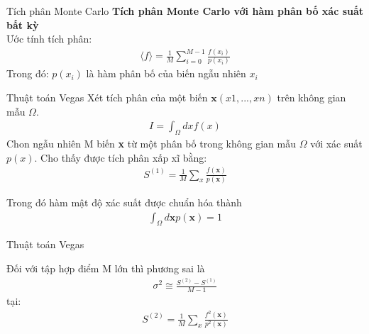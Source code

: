 \documentclass{beamer}
\begin{document}
\begin{frame}{Tích phân Monte Carlo}\vspace{4pt}
  \textbf{Tích phân Monte Carlo với hàm phân bố xác suất bất kỳ}\\
  \vspace{4em}
    Ước tính tích phân: 
  \begin{align}
    \langle{f}\rangle=\frac{1}{M}\sum_{i=0}^{M-1}{\frac{f(x_i)}{p(x_i)}}
  \end{align}
  \vspace{0.5em}
Trong đó: $p(x_i)$ là hàm phân bố của biến ngẫu nhiên $x_i$\\
  \end{frame}
\begin{frame}{Thuật toán Vegas}\vspace{4pt}
  \vspace{0.4em}
  Xét tích phân của một biến $\textbf{x}(x1,...,xn)$ trên không gian mẫu $\Omega$.
\begin{align}
      I=\int_\Omega{dxf(x)}
  \end{align}
  Chon ngẫu nhiên M biến \textbf{x} từ một phân bố trong không gian mẫu $\Omega$ với xác suất $p(x)$. Cho thấy được tích phân xấp xĩ bằng:
  \begin{align}
    S^{(1)}={\frac{1}{M}}\sum_x{\frac{f(\textbf{x})}{p(\textbf{x})}}\label{pt3.4}
\end{align}
 
Trong đó hàm mật độ xác suất được chuẩn hóa thành
\begin{align}
      \int_{\Omega}{d\textbf{x}p(\textbf{x})}=1
\end{align}
  \end{frame}

  \begin{frame}{Thuật toán Vegas}\vspace{4pt}
    \vspace{0.4em}
  
    Đối với tập hợp điểm M lớn thì phương sai là
\begin{align}
      \sigma^2\cong\frac{S^{(2)}-S^{(1)}}{M-1}\label{pt3.7}
\end{align}
tại: 
\begin{align}
      S^{(2)}=\frac{1}{M}\sum_x{\frac{f^2(\textbf{x})}{p^2(\textbf{x})}}
\end{align}

  \end{frame}
\end{document}
